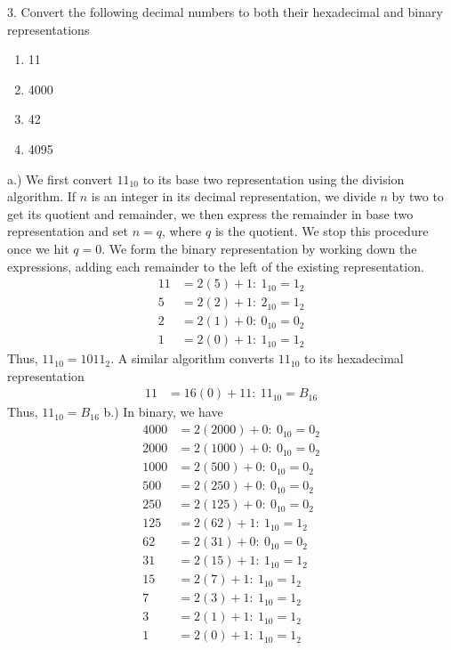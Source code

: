 \documentclass{report}
\begin{document}
    \pagebreak \bigbreak \noindent 
    \begin{mdframed}
        3. Convert the following decimal numbers to both their hexadecimal and binary representations
        \begin{enumerate}[label=\alph*.]
            \item 11 
            \item 4000
            \item 42
            \item 4095
        \end{enumerate}
    \end{mdframed}
    \bigbreak \noindent 
    a.) We first convert $11_{10}$ to its base two representation using the division algorithm. If $n$ is an integer in its decimal representation, we divide $n$ by two to get its quotient and remainder, we then express the remainder in base two representation and set $n=q$, where $q$ is the quotient. We stop this procedure once we hit $q=0$. We form the binary representation by working down the expressions, adding each remainder to the left of the existing representation.
    \begin{align*}
        11 &= 2(5) + 1:\ 1_{10} = 1_{2} \\
        5 &= 2(2) + 1:\ 2_{10} = 1_{2} \\
        2 &= 2(1) + 0:\ 0_{10} = 0_{2} \\
        1 &= 2(0) + 1:\ 1_{10} = 1_{2} 
    \end{align*}
    Thus, $11_{10} = 1011_{2}$. A similar algorithm converts $11_{10}$ to its hexadecimal representation
    \begin{align*}
        11 &= 16(0) + 11:\ 11_{10} = B_{16}
    \end{align*}
    Thus, $11_{10} =  B_{16}$
    \bigbreak \noindent 
    b.) In binary, we have 
    \begin{align*}
        4000 &= 2(2000) + 0:\ 0_{10} = 0_{2} \\
        2000 &= 2(1000) + 0:\ 0_{10} = 0_{2} \\
        1000 &= 2(500) + 0:\ 0_{10} = 0_{2} \\
        500 &= 2(250) + 0:\ 0_{10} = 0_{2} \\
        250 &= 2(125) + 0:\ 0_{10} = 0_{2} \\
        125 &= 2(62) + 1:\ 1_{10} = 1_{2} \\
        62 &= 2(31) + 0:\ 0_{10} = 0_{2} \\
        31 &= 2(15) + 1:\ 1_{10} = 1_{2} \\
        15 &= 2(7) +1:\ 1_{10} = 1_{2} \\
        7 &= 2(3) +1:\ 1_{10} = 1_{2} \\
        3 &=2(1) + 1:\ 1_{10} = 1_{2} \\
        1 &= 2(0) + 1:\ 1_{10} = 1_{2}
    \end{align*}
\end{document}
